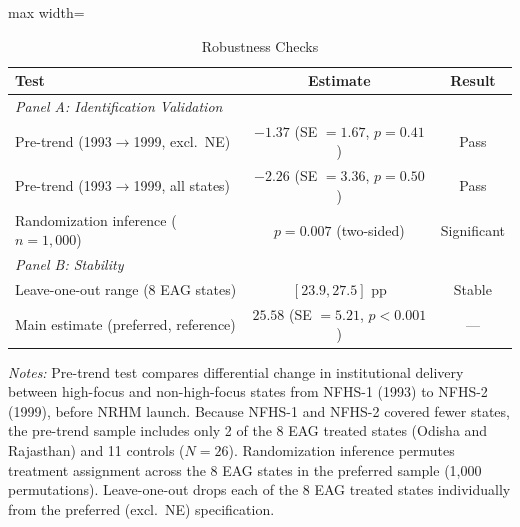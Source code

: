 \begin{table}[htbp]
\centering
\caption{Robustness Checks}
\label{tab:robustness}
\begin{adjustbox}{max width=\textwidth}
\begin{tabular}{lcc}
\hline\hline
Test & Estimate & Result \\
\hline
\multicolumn{3}{l}{\textit{Panel A: Identification Validation}} \\
Pre-trend (1993$\rightarrow$1999, excl.\ NE) & $-1.37$ (SE $= 1.67$, $p = 0.41$) & Pass \\
Pre-trend (1993$\rightarrow$1999, all states) & $-2.26$ (SE $= 3.36$, $p = 0.50$) & Pass \\
Randomization inference ($n = 1{,}000$) & $p = 0.007$ (two-sided) & Significant \\
\hline
\multicolumn{3}{l}{\textit{Panel B: Stability}} \\
Leave-one-out range (8 EAG states) & $[23.9, 27.5]$ pp & Stable \\
Main estimate (preferred, reference) & $25.58$ (SE $= 5.21$, $p < 0.001$) & --- \\
\hline\hline
\end{tabular}
\end{adjustbox}
\begin{minipage}{0.95\textwidth}
\footnotesize
\textit{Notes:} Pre-trend test compares differential change in institutional delivery between high-focus and non-high-focus states from NFHS-1 (1993) to NFHS-2 (1999), before NRHM launch. Because NFHS-1 and NFHS-2 covered fewer states, the pre-trend sample includes only 2 of the 8 EAG treated states (Odisha and Rajasthan) and 11 controls ($N=26$). Randomization inference permutes treatment assignment across the 8 EAG states in the preferred sample (1,000 permutations). Leave-one-out drops each of the 8 EAG treated states individually from the preferred (excl.\ NE) specification.
\end{minipage}
\end{table}
